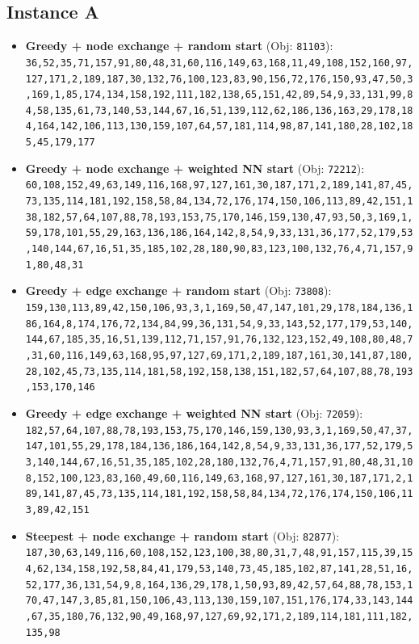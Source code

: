 \subsection{Instance A}
\begin{itemize}[leftmargin=1.5em]
    \item \textbf{Greedy + node exchange + random start} (Obj: \texttt{81103}):\\
    \texttt{36,52,35,71,157,91,80,48,31,60,116,149,63,168,11,49,108,152,160,97,127,171,2,189,187,30,132,76,100,123,83,90,156,72,176,150,93,47,50,3,169,1,85,174,134,158,192,111,182,138,65,151,42,89,54,9,33,131,99,84,58,135,61,73,140,53,144,67,16,51,139,112,62,186,136,163,29,178,184,164,142,106,113,130,159,107,64,57,181,114,98,87,141,180,28,102,185,45,179,177}
    \item \textbf{Greedy + node exchange + weighted NN start} (Obj: \texttt{72212}):\\
    \texttt{60,108,152,49,63,149,116,168,97,127,161,30,187,171,2,189,141,87,45,73,135,114,181,192,158,58,84,134,72,176,174,150,106,113,89,42,151,138,182,57,64,107,88,78,193,153,75,170,146,159,130,47,93,50,3,169,1,59,178,101,55,29,163,136,186,164,142,8,54,9,33,131,36,177,52,179,53,140,144,67,16,51,35,185,102,28,180,90,83,123,100,132,76,4,71,157,91,80,48,31}
    \item \textbf{Greedy + edge exchange + random start} (Obj: \texttt{73808}):\\
    \texttt{159,130,113,89,42,150,106,93,3,1,169,50,47,147,101,29,178,184,136,186,164,8,174,176,72,134,84,99,36,131,54,9,33,143,52,177,179,53,140,144,67,185,35,16,51,139,112,71,157,91,76,132,123,152,49,108,80,48,7,31,60,116,149,63,168,95,97,127,69,171,2,189,187,161,30,141,87,180,28,102,45,73,135,114,181,58,192,158,138,151,182,57,64,107,88,78,193,153,170,146}
    \item \textbf{Greedy + edge exchange + weighted NN start} (Obj: \texttt{72059}):\\
    \texttt{182,57,64,107,88,78,193,153,75,170,146,159,130,93,3,1,169,50,47,37,147,101,55,29,178,184,136,186,164,142,8,54,9,33,131,36,177,52,179,53,140,144,67,16,51,35,185,102,28,180,132,76,4,71,157,91,80,48,31,108,152,100,123,83,160,49,60,116,149,63,168,97,127,161,30,187,171,2,189,141,87,45,73,135,114,181,192,158,58,84,134,72,176,174,150,106,113,89,42,151}
    \item \textbf{Steepest + node exchange + random start} (Obj: \texttt{82877}):\\
    \texttt{187,30,63,149,116,60,108,152,123,100,38,80,31,7,48,91,157,115,39,154,62,134,158,192,58,84,41,179,53,140,73,45,185,102,87,141,28,51,16,52,177,36,131,54,9,8,164,136,29,178,1,50,93,89,42,57,64,88,78,153,170,47,147,3,85,81,150,106,43,113,130,159,107,151,176,174,33,143,144,67,35,180,76,132,90,49,168,97,127,69,92,171,2,189,114,181,111,182,135,98}

\end{itemize}
